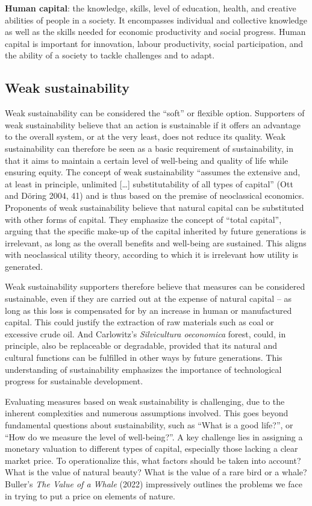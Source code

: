 \documentclass[
  a4paper,
  DIV=11,
  numbers=noendperiod,
  oneside,
  openany]{scrreprt}
\begin{document}
\textbf{Human capital}: the knowledge, skills, level of education,
health, and creative abilities of people in a society. It encompasses
individual and collective knowledge as well as the skills needed for
economic productivity and social progress. Human capital is important
for innovation, labour productivity, social participation, and the
ability of a society to tackle challenges and to adapt.

\subsection{Weak sustainability}\label{weak-sustainability}

Weak sustainability can be considered the ``soft'' or flexible option.
Supporters of weak sustainability believe that an action is sustainable
if it offers an advantage to the overall system, or at the very least,
does not reduce its quality. Weak sustainability can therefore be seen
as a basic requirement of sustainability, in that it aims to maintain a
certain level of well-being and quality of life while ensuring equity.
The concept of weak sustainability ``assumes the extensive and, at least
in principle, unlimited {[}\ldots{]} substitutability of all types of
capital'' (Ott and Döring 2004, 41) and is thus based on the premise of
neoclassical economics. Proponents of weak sustainability believe that
natural capital can be substituted with other forms of capital. They
emphasize the concept of ``total capital'', arguing that the specific
make-up of the capital inherited by future generations is irrelevant, as
long as the overall benefits and well-being are sustained. This aligns
with neoclassical utility theory, according to which it is irrelevant
how utility is generated.

Weak sustainability supporters therefore believe that measures can be
considered sustainable, even if they are carried out at the expense of
natural capital -- as long as this loss is compensated for by an
increase in human or manufactured capital. This could justify the
extraction of raw materials such as coal or excessive crude oil. And
Carlowitz's \emph{Silvicultura oeconomica} forest, could, in principle,
also be replaceable or degradable, provided that its natural and
cultural functions can be fulfilled in other ways by future generations.
This understanding of sustainability emphasizes the importance of
technological progress for sustainable development.

Evaluating measures based on weak sustainability is challenging, due to
the inherent complexities and numerous assumptions involved. This goes
beyond fundamental questions about sustainability, such as ``What is a
good life?'', or ``How do we measure the level of well-being?''. A key
challenge lies in assigning a monetary valuation to different types of
capital, especially those lacking a clear market price. To
operationalize this, what factors should be taken into account? What is
the value of natural beauty? What is the value of a rare bird or a
whale? Buller's \emph{The Value of a Whale} (2022) impressively outlines
the problems we face in trying to put a price on elements of nature.
\end{document}
